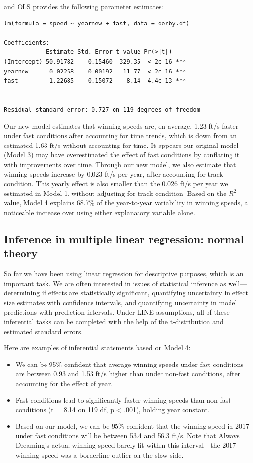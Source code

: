 \documentclass[
]{krantz}
\providecommand{\tightlist}{%
  \setlength{\itemsep}{0pt}\setlength{\parskip}{0pt}}
\begin{document}
and OLS provides the following parameter estimates:

\begin{verbatim}
lm(formula = speed ~ yearnew + fast, data = derby.df)

Coefficients:
            Estimate Std. Error t value Pr(>|t|)    
(Intercept) 50.91782    0.15460  329.35  < 2e-16 ***
yearnew      0.02258    0.00192   11.77  < 2e-16 ***
fast         1.22685    0.15072    8.14  4.4e-13 ***
---

Residual standard error: 0.727 on 119 degrees of freedom
\end{verbatim}

Our new model estimates that winning speeds are, on average, 1.23 ft/s faster under fast conditions after accounting for time trends, which is down from an estimated 1.63 ft/s without accounting for time. It appears our original model (Model 3) may have overestimated the effect of fast conditions by conflating it with improvements over time. Through our new model, we also estimate that winning speeds increase by 0.023 ft/s per year, after accounting for track condition. This yearly effect is also smaller than the 0.026 ft/s per year we estimated in Model 1, without adjusting for track condition. Based on the \(R^2\) value, Model 4 explains 68.7\% of the year-to-year variability in winning speeds, a noticeable increase over using either explanatory variable alone.

\hypertarget{multreg-inference}{%
\subsection{Inference in multiple linear regression: normal theory}\label{multreg-inference}}

So far we have been using linear regression for descriptive purposes, which is an important task. We are often interested in issues of statistical inference as well---determining if effects are statistically significant, quantifying uncertainty in effect size estimates with confidence intervals, and quantifying uncertainty in model predictions with prediction intervals. Under LINE assumptions, all of these inferential tasks can be completed with the help of the t-distribution and estimated standard errors.

Here are examples of inferential statements based on Model 4:

\begin{itemize}
\tightlist
\item
  We can be 95\% confident that average winning speeds under fast conditions are between 0.93 and 1.53 ft/s higher than under non-fast conditions, after accounting for the effect of year.
\item
  Fast conditions lead to significantly faster winning speeds than non-fast conditions (t = 8.14 on 119 df, p \textless{} .001), holding year constant.
\item
  Based on our model, we can be 95\% confident that the winning speed in 2017 under fast conditions will be between 53.4 and 56.3 ft/s. Note that Always Dreaming's actual winning speed barely fit within this interval---the 2017 winning speed was a borderline outlier on the slow side.
\end{itemize}
\end{document}
